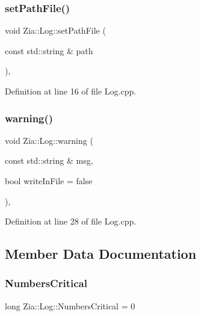 \subsubsection{\texorpdfstring{set\+Path\+File()}{setPathFile()}}
{\footnotesize\ttfamily void Zia\+::\+Log\+::set\+Path\+File (\begin{DoxyParamCaption}\item[{const std\+::string \&}]{path }\end{DoxyParamCaption})\hspace{0.3cm}{\ttfamily [static]}, {\ttfamily [noexcept]}}



Definition at line 16 of file Log.\+cpp.

\mbox{\label{class_zia_1_1_log_a4522d6218b4fb537c4291c36c171a855}} 
\subsubsection{\texorpdfstring{warning()}{warning()}}
{\footnotesize\ttfamily void Zia\+::\+Log\+::warning (\begin{DoxyParamCaption}\item[{const std\+::string \&}]{msg,  }\item[{bool}]{write\+In\+File = {\ttfamily false} }\end{DoxyParamCaption})\hspace{0.3cm}{\ttfamily [static]}, {\ttfamily [noexcept]}}



Definition at line 28 of file Log.\+cpp.



\subsection{Member Data Documentation}
\mbox{\label{class_zia_1_1_log_ada4fab060168cbb9504c7ffa4b762868}} 
\subsubsection{\texorpdfstring{Numbers\+Critical}{NumbersCritical}}
{\footnotesize\ttfamily long Zia\+::\+Log\+::\+Numbers\+Critical = 0\hspace{0.3cm}{\ttfamily [static]}}



